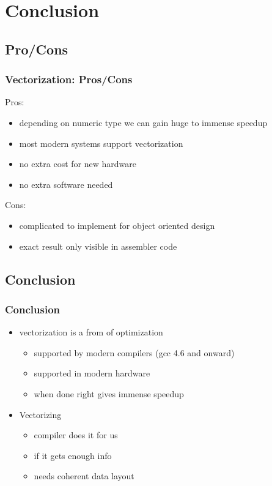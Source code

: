 \documentclass[compress]{beamer}
\begin{document}
\section{Conclusion}
\subsection{Pro/Cons}
\begin{frame}
    \frametitle{Vectorization: Pros/Cons}
    Pros:
    \begin{itemize}
        \item depending on numeric type we can gain huge to immense speedup
        \item most modern systems support vectorization
        \item no extra cost for new hardware
        \item no extra software needed
    \end{itemize}
    Cons:
    \begin{itemize}
        \item complicated to implement for object oriented design
        \item exact result only visible in assembler code 
    \end{itemize}
\end{frame}

\subsection{Conclusion}
\begin{frame}
	\frametitle{Conclusion}

	\begin{itemize}
        \item vectorization is a from of optimization
            \begin{itemize}
                \item supported by modern compilers (gcc 4.6 and onward)
			\item supported in modern hardware
            \item when done right gives immense speedup
		\end{itemize}
		\item Vectorizing
		\begin{itemize}
			\item compiler does it for us
			\item if it gets enough info
            \item needs coherent data layout 
		\end{itemize}
	\end{itemize}
\end{frame}
\end{document}
